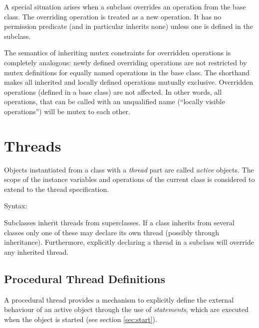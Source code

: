 \documentclass[\pformat,12pt]{article}
\begin{document}
A special situation arises when a subclass overrides an
operation from the base class. The overriding operation is
treated as a new operation.  It has no permission predicate (and in
particular inherits none) unless one is defined in the subclass.

The semantics of inheriting mutex constraints for overridden
operations is completely analogous: newly defined overriding
operations are not restricted by mutex definitions for equally named
operations in the base class. The  shorthand makes all
inherited and locally defined operations mutually
exclusive. Overridden operations (defined in a base class) are not
affected. In other words, all operations, that can be called with an
unqualified name (``locally visible operations'') will be mutex to
each other.



\section{Threads}\label{ch:thread}

Objects instantiated from a class with a {\em thread} part are called
{\em active} objects.  The scope of the instance variables and 
operations of the current class is considered to extend to the thread
specification.

\begin{description}
\item[Syntax:]   
\end{description}

Subclasses inherit threads from superclasses. 
If a class inherits from several classes only one of these may declare
its own thread (possibly through inheritance). Furthermore, explicitly
declaring a thread in a subclass will override any inherited thread.  


\subsection{Procedural Thread Definitions}\label{se:proc-thread}

A procedural thread provides a mechanism to explicitly define the
external behaviour of an active object through the use of {\em
statements}, which are executed when the object is started (see
section \ref{sec:start}).  
\end{document}
